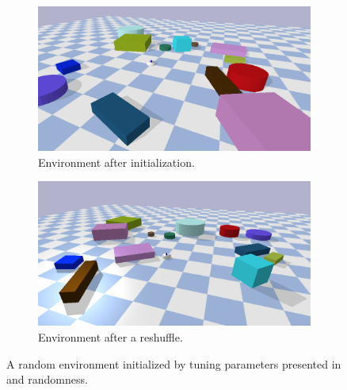 \begin{figure}[H]
    \centering
    \begin{subfigure}{.49\textwidth}
    \centering
    \includegraphics[width=\textwidth]{figures/results/random1}
    \caption{Environment after initialization.}
    \end{subfigure}
    \hfill
    \begin{subfigure}{.49\textwidth}
    \centering
    \includegraphics[width=\textwidth]{figures/results/random2}
    \caption{Environment after a reshuffle.}
    \end{subfigure}

    \caption{A random environment initialized by tuning parameters presented in  and randomness.}%
    \label{fig:random_environment_reshuffle}
\end{figure}

